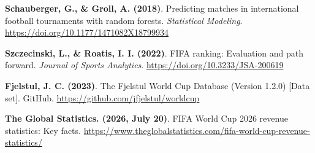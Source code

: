 \documentclass{article}
\begin{document}
\textbf{Schauberger, G., \& Groll, A. (2018)}. Predicting matches in international football tournaments with random forests. \emph{Statistical Modeling}. \url{https://doi.org/10.1177/1471082X18799934}

\noindent \textbf{Szczecinski, L., \& Roatis, I. I. (2022)}. FIFA ranking: Evaluation and path forward. \emph{Journal of Sports Analytics}. \url{https://doi.org/10.3233/JSA-200619}

\noindent \textbf{Fjelstul, J. C. (2023)}. The Fjelstul World Cup Database (Version 1.2.0) [Data set]. GitHub. \url{https://github.com/jfjelstul/worldcup}

\noindent \textbf{The Global Statistics. (2026, July 20)}. FIFA World Cup 2026 revenue statistics: Key facts. \url{https://www.theglobalstatistics.com/fifa-world-cup-revenue-statistics/}
\end{document}
